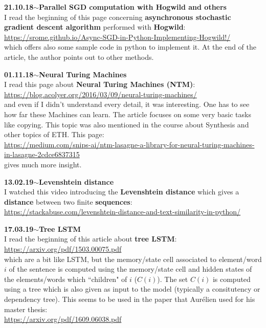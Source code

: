 \documentclass[11pt,a4paper]{article}
\newenvironment{loggentry}[2]%
{\noindent\textbf{#1}\hspace{1cm}$\mathbf{\sim}$\text{ }\textbf{#2}\\}{\vspace{0.5cm}}
\begin{document}
\begin{loggentry}{21.10.18}{Parallel SGD computation with Hogwild and others}

I read the beginning of this page concerning \textbf{asynchronous stochastic gradient descent algorithm} performed with \textbf{Hogwild}:\\
\url{https://srome.github.io/Async-SGD-in-Python-Implementing-Hogwild!/}\\
which offers also some sample code in python to implement it. At the end of the article, the author points out to other methods.\\

\end{loggentry}

\begin{loggentry}{01.11.18}{Neural Turing Machines}

I read this page about \textbf{Neural Turing Machines (NTM)}:\\
\url{https://blog.acolyer.org/2016/03/09/neural-turing-machines/}\\
and even if I didn't understand every detail, it was interesting. One has to see how far these Machines can learn. The article focuses on some very basic tasks like copying. This topic was also mentioned in the course about Synthesis and other topics of ETH. This page:\\
\url{https://medium.com/snips-ai/ntm-lasagne-a-library-for-neural-turing-machines-in-lasagne-2cdce6837315}\\
gives much more insight.\\

\end{loggentry}


\begin{loggentry}{13.02.19}{Levenshtein distance}

I watched this video introducing the \textbf{Levenshtein distance} which gives a \textbf{distance} between two finite \textbf{sequences}:\\
\url{https://stackabuse.com/levenshtein-distance-and-text-similarity-in-python/}

\end{loggentry}


\begin{loggentry}{17.03.19}{Tree LSTM}

I read the beginning of this article about \textbf{tree LSTM}:\\
\url{https://arxiv.org/pdf/1503.00075.pdf}\\
which are a bit like LSTM, but the memory/state cell associated to element/word $i$ of the sentence is computed using the memory/state cell and hidden states of the elements/words which ``children" of $i$ ($C(i)$). The set $C(i)$ is computed using a tree which is also given as input to the model (typically a consitutency or dependency tree). This seems to be used in the paper that Aurélien used for his master thesis:\\
\url{https://arxiv.org/pdf/1609.06038.pdf}\\

\end{loggentry}
\end{document}
